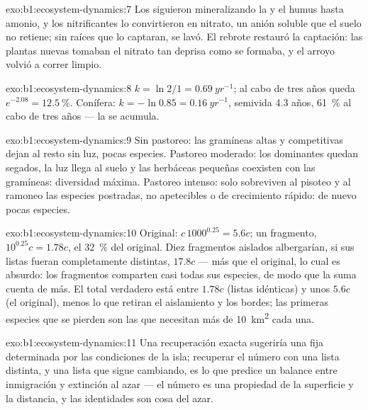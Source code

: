 \begin{solution}{exo:b1:ecosystem-dynamics:7}
Los  siguieron mineralizando la  y el humus hasta
amonio, y los nitrificantes lo convirtieron en nitrato, un anión soluble que
el suelo no retiene; sin raíces que lo captaran, se lavó. El rebrote
restauró la captación: las plantas nuevas tomaban el nitrato tan deprisa
como se formaba, y el arroyo volvió a correr limpio.
\end{solution}

\begin{solution}{exo:b1:ecosystem-dynamics:8}
$k = \ln 2/1 = \qty{0.69}{yr^{-1}}$; al cabo de tres años queda
$e^{-2.08} =
\qty{12.5}{\%}$. Conífera: $k = -\ln 0.85 = \qty{0.16}{yr^{-1}}$,
semivida \num{4.3} años, \qty{61}{\%} al cabo de tres años --- la 
se acumula.
\end{solution}

\begin{solution}{exo:b1:ecosystem-dynamics:9}
Sin pastoreo: las gramíneas altas y competitivas dejan al resto sin luz,
pocas especies. Pastoreo moderado: los dominantes quedan segados, la luz
llega al suelo y las herbáceas pequeñas coexisten con las gramíneas:
diversidad máxima. Pastoreo intenso: solo sobreviven al pisoteo y al ramoneo
las especies postradas, no apetecibles o de crecimiento rápido: de nuevo
pocas especies.
\end{solution}

\begin{solution}{exo:b1:ecosystem-dynamics:10}
Original: $c\,1000^{0.25} = 5.6c$; un fragmento, $10^{0.25}c = 1.78c$, el
\qty{32}{\%} del original. Diez fragmentos aislados albergarían, si sus
listas fueran completamente distintas, $17.8c$ --- más que el original, lo
cual es absurdo: los fragmentos comparten casi todas sus especies, de modo
que la suma cuenta de más. El total verdadero está entre $1.78c$ (listas
idénticas) y unos $5.6c$ (el original), menos lo que retiran el aislamiento
y los bordes; las primeras especies que se pierden son las que necesitan más
de \qty{10}{km^2} cada una.
\end{solution}

\begin{solution}{exo:b1:ecosystem-dynamics:11}
Una recuperación exacta sugeriría una  fija determinada por las
condiciones de la isla; recuperar el número con una lista distinta, y una
lista que sigue cambiando, es lo que predice un balance entre inmigración y
extinción al azar --- el número es una propiedad de la superficie y la
distancia, y las identidades son cosa del azar.
\end{solution}


